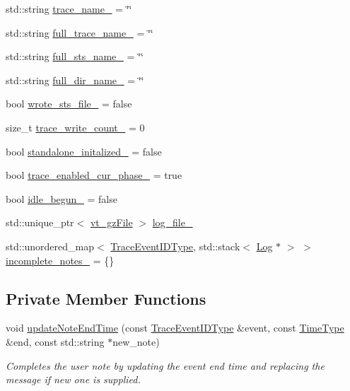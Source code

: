 \begin{DoxyCompactItemize}
std\+::string \hyperlink{structvt_1_1trace_1_1_trace_lite_ae6209336c8aabf62ec626fa6b8fbc8ee}{trace\+\_\+name\+\_\+} = \char`\"{}\char`\"{}
\item 
std\+::string \hyperlink{structvt_1_1trace_1_1_trace_lite_a0381e516d389555b3b40b954d276eff9}{full\+\_\+trace\+\_\+name\+\_\+} = \char`\"{}\char`\"{}
\item 
std\+::string \hyperlink{structvt_1_1trace_1_1_trace_lite_aa7236609212e978252ddefd9c0131537}{full\+\_\+sts\+\_\+name\+\_\+} = \char`\"{}\char`\"{}
\item 
std\+::string \hyperlink{structvt_1_1trace_1_1_trace_lite_a3871cf535ca6f31bfb499a46cde4c80c}{full\+\_\+dir\+\_\+name\+\_\+} = \char`\"{}\char`\"{}
\item 
bool \hyperlink{structvt_1_1trace_1_1_trace_lite_a3af89ea00d5dfcf4341aabf9c2b33aef}{wrote\+\_\+sts\+\_\+file\+\_\+} = false
\item 
size\+\_\+t \hyperlink{structvt_1_1trace_1_1_trace_lite_ac4f99b5bd44df7b4aa07b700fab162c7}{trace\+\_\+write\+\_\+count\+\_\+} = 0
\item 
bool \hyperlink{structvt_1_1trace_1_1_trace_lite_a1c41f9e975ef1ba41cc6550bab7b2375}{standalone\+\_\+initalized\+\_\+} = false
\item 
bool \hyperlink{structvt_1_1trace_1_1_trace_lite_ae75d01f083974fe39f81455377ac3842}{trace\+\_\+enabled\+\_\+cur\+\_\+phase\+\_\+} = true
\item 
bool \hyperlink{structvt_1_1trace_1_1_trace_lite_a75ffdb0ab1dea68a665085596ece7b96}{idle\+\_\+begun\+\_\+} = false
\item 
std\+::unique\+\_\+ptr$<$ \hyperlink{structvt_1_1trace_1_1vt__gz_file}{vt\+\_\+gz\+File} $>$ \hyperlink{structvt_1_1trace_1_1_trace_lite_ab074b4892ac4fd0508c03150710eb46d}{log\+\_\+file\+\_\+}
\item 
std\+::unordered\+\_\+map$<$ \hyperlink{namespacevt_1_1trace_a64a7185f3e102df8d8258f263ccd1582}{Trace\+Event\+I\+D\+Type}, std\+::stack$<$ \hyperlink{structvt_1_1trace_1_1_log}{Log} $\ast$ $>$ $>$ \hyperlink{structvt_1_1trace_1_1_trace_lite_a4dfaaf4c511ee3a00d2d5115360db5c9}{incomplete\+\_\+notes\+\_\+} = \{\}
\end{DoxyCompactItemize}
\subsection*{Private Member Functions}
\begin{DoxyCompactItemize}
\item 
void \hyperlink{structvt_1_1trace_1_1_trace_lite_afbe52188ff86e719baf520c0c68a8ee7}{update\+Note\+End\+Time} (const \hyperlink{namespacevt_1_1trace_a64a7185f3e102df8d8258f263ccd1582}{Trace\+Event\+I\+D\+Type} \&event, const \hyperlink{namespacevt_a2b9f28078dc309ad0706b69ded743e69}{Time\+Type} \&end, const std\+::string $\ast$new\+\_\+note)
\begin{DoxyCompactList}\small\item\em Completes the user note by updating the event end time and replacing the message if new one is supplied. \end{DoxyCompactList}\end{DoxyCompactItemize}


